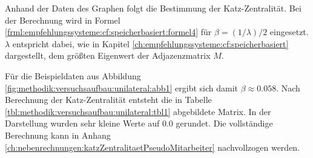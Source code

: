 Anhand der Daten des Graphen folgt die Bestimmung der Katz-Zentralität. Bei der Berechnung wird in Formel \ref{frml:empfehlungssysteme:cf:speicherbasiert:formel4} für $\beta = (1/\lambda)/2$ eingesetzt. $\lambda$ entspricht dabei, wie in Kapitel \ref{ch:empfehlungssysteme:cf:speicherbasiert} dargestellt, dem größten Eigenwert der Adjazenzmatrix $M$.

Für die Beispieldaten aus Abbildung \ref{fig:methodik:versuchsaufbau:unilateral:abb1} ergibt sich damit $\beta \approx 0.058$. Nach Berechnung der Katz-Zentralität entsteht die in Tabelle \ref{tbl:methodik:versuchsaufbau:unilateral:tbl1} abgebildete Matrix. In der Darstellung wurden sehr kleine Werte auf 0.0 gerundet. Die vollständige Berechnung kann in Anhang \ref{ch:nebenrechnungen:katzZentralitaetPseudoMitarbeiter} nachvollzogen werden.

